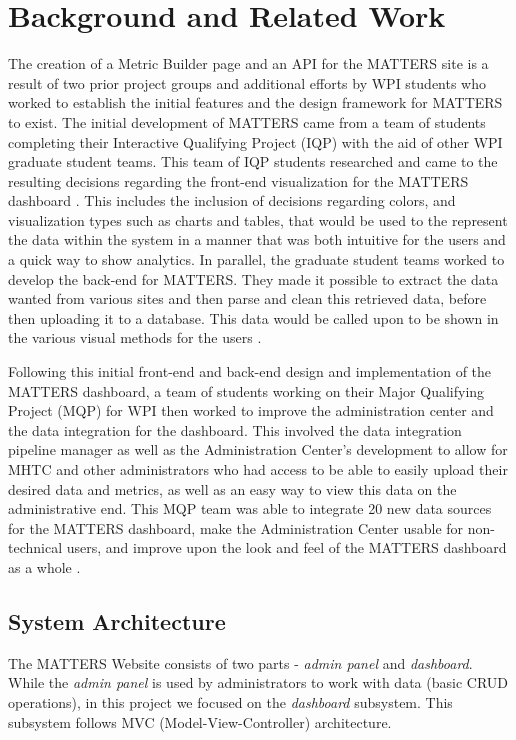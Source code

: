 \chapter{Background and Related Work}

	The creation of a Metric Builder page and an API for the MATTERS site is a 
	result of two prior project groups and additional efforts by WPI students 
	who worked to establish the initial features and the design framework for 
	MATTERS to exist. The initial development of MATTERS came from a team of 
	students completing their Interactive Qualifying Project (IQP) with the 
	aid of other WPI graduate student teams. This team of IQP students researched 
	and came to the resulting decisions regarding the front-end visualization for 
	the MATTERS dashboard \cite{prevreport}. This includes the inclusion of decisions 
	regarding colors, and visualization types such as charts and tables, that would 
	be used to the represent the data within the system in a manner that was both 
	intuitive for the users and a quick way to show analytics. In parallel, 
	the graduate student teams worked to develop the back-end for MATTERS. 
	They made it possible to extract the data wanted from various sites and 
	then parse and clean this retrieved data, before then uploading it to a 
	database. This data would be called upon to be shown in the various visual 
	methods for the users \cite{iqp}.

	Following this initial front-end and back-end design and implementation 
	of the MATTERS dashboard, a team of students working on their Major Qualifying 
	Project (MQP) for WPI then worked to improve the administration center and the 
	data integration for the dashboard. This involved the data integration pipeline 
	manager as well as the Administration Center's development to allow for MHTC 
	and other administrators who had access to be able to easily upload their 
	desired data and metrics, as well as an easy way to view this data on the 
	administrative end. This MQP team was able to integrate 20 new data sources 
	for the MATTERS dashboard, make the Administration Center usable for 
	non-technical users, and improve upon the look and feel of the MATTERS 
	dashboard as a whole \cite{iqp}.

	\section{System Architecture}
	
		The MATTERS Website consists of two parts - \emph{admin panel} and \emph{dashboard}.
		While the \emph{admin panel} is used by administrators to work with data 
		(basic CRUD operations), in this project we focused on the \emph{dashboard} subsystem.
		This subsystem follows MVC (Model-View-Controller) architecture.
		
